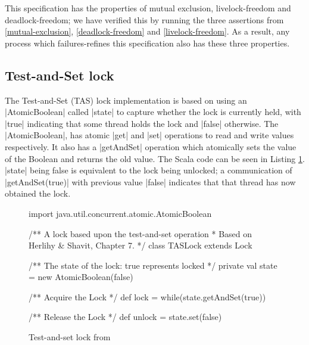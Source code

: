 This specification has the properties of mutual exclusion, livelock-freedom and deadlock-freedom; we have verified this by running the three assertions from \ref{mutual-exclusion}, \ref{deadlock-freedom} and \ref{livelock-freedom}. As a result, any process which failures-refines this specification also has these three properties. 

\subsection{Test-and-Set lock}

The Test-and-Set (TAS) lock implementation is based on using an |AtomicBoolean| called |state| to capture whether the lock is currently held, with |true| indicating that some thread holds the lock and |false| otherwise. The |AtomicBoolean|, has atomic |get| and |set| operations to read and write values respectively. It also has a |getAndSet| operation which atomically sets the value of the Boolean and returns the old value. The Scala code can be seen in Listing \ref{fig:TASScala}. |state| being false is equivalent to the lock being unlocked; a communication of |getAndSet(true)| with previous value |false| indicates that that thread has now obtained the lock. %

\begin{figure}
  \begin{scala}
  import java.util.concurrent.atomic.AtomicBoolean

  /** A lock based upon the test-and-set operation 
    * Based on Herlihy & Shavit, Chapter 7. */
  class TASLock extends Lock{
    /** The state of the lock: true represents locked */
    private val state = new AtomicBoolean(false)

    /** Acquire the Lock */ 
    def lock = while(state.getAndSet(true)){ }

    /** Release the Lock */
    def unlock = state.set(false)
  }
  \end{scala}
  \caption{Test-and-set lock from \cite{CADS} \label{fig:TASScala}}
\end{figure}

